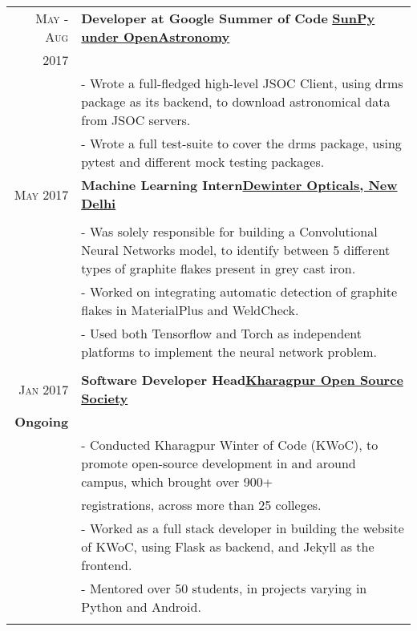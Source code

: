 \documentclass[a4paper,10pt]{extarticle} %
\begin{document}
\begin{tabular}{r|p{18cm}}

\textsc{May - Aug} & \textbf{Developer at Google Summer of Code} \textsc\hfill\textbf{\href{http://sunpy.org/}{SunPy under OpenAstronomy}}\\
\textsc{2017}\\
& \footnotesize{- Wrote a full-fledged high-level JSOC Client, using drms package as its backend, to download astronomical data from JSOC servers.}\\
& \footnotesize{- Wrote a full test-suite to cover the drms package, using pytest and different mock testing packages. }
\multicolumn{2}{c}{} \\
\textsc{May 2017} & \textbf{Machine Learning Intern}\hfill\textbf{\href{http://www.dewinterindia.com/}{Dewinter Opticals, New Delhi}}\\
\\
& \footnotesize{- Was solely responsible for building a Convolutional Neural Networks model, to identify between 5 different types of graphite flakes present in grey cast iron. }\\
& \footnotesize{- Worked on integrating automatic detection of graphite flakes in MaterialPlus and WeldCheck.}\\
& \footnotesize{- Used both Tensorflow and Torch as independent platforms to implement the neural network problem.
}\\
\multicolumn{2}{c}{} \\

\textsc{Jan 2017} & \textbf{Software Developer Head}\hfill\textbf{\href{http://kossiitkgp.in/}{Kharagpur Open Source Society}}\\
\textbf{Ongoing}\\
& \footnotesize{- Conducted Kharagpur Winter of Code (KWoC), to promote open-source development in and around campus, which brought over 900+}\\
& \footnotesize{registrations, across more than 25 colleges.
}\\
& \footnotesize{- Worked as a full stack developer in building the website of KWoC, using Flask as backend, and Jekyll as the frontend.}\\
& \footnotesize{- Mentored over 50 students, in projects varying in Python and Android.}\\
\multicolumn{2}{c}{} \\

\end{tabular}
\end{document}
